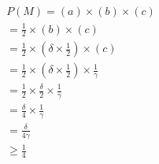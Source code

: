 \begin{align}
\label{eqn:eqn-odds-round}
P(M) = (a) \times (b) \times (c)\\
= \frac{1}{2} \times (b) \times (c) \\
= \frac{1}{2} \times \left(\delta \times\frac{1}{2} \right)\times (c) \\
= \frac{1}{2} \times \left(\delta \times \frac{1}{2} \right)\times \frac{1}{\gamma}\\
= \frac{1}{2} \times \frac{\delta}{2} \times \frac{1}{\gamma}\\
= \frac{\delta}{4} \times \frac{1}{\gamma}\\
= \frac{\delta}{4\gamma}\\
\ge \frac{1}{4}
\end{align} 
